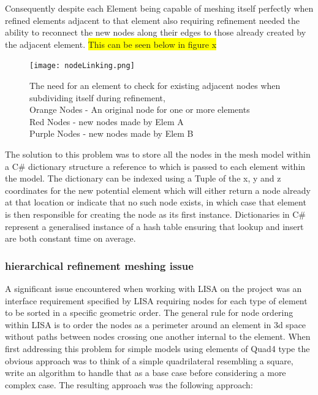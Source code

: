 \documentclass{article}
\begin{document}
\noindent
Consequently despite each Element being capable of meshing itself perfectly when refined elements adjacent to that element also requiring refinement needed the ability to reconnect the new nodes along their edges to those already created by the adjacent element. \colorbox{yellow}{This can be seen below in figure x} \\ 


\begin{figure}
  \centerline{\texttt{[image: nodeLinking.png]}}
  \caption{The need for an element to check for existing adjacent nodes when subdividing itself during refinement,\\
  	Orange Nodes - An original node for one or more elements \\
	Red Nodes - new nodes made by Elem A \\
	Purple Nodes - new nodes made by Elem B \\
  }
  \label{fig:h-refinementImp}
\end{figure}


\noindent
The solution to this problem was to store all the nodes in the mesh model within a C\# dictionary structure a reference to which is passed to each element within the model. The dictionary can be indexed using a Tuple of the x, y and z coordinates for the new potential element which will either return a node already at that location or indicate that no such node exists, in which case that element is then responsible for creating the node as its first instance. Dictionaries in C\# represent a generalised instance of a hash table ensuring that lookup and insert are both constant time on average.


\subsubsection{hierarchical refinement meshing issue}
A significant issue encountered when working with LISA on the project was an interface requirement specified by LISA requiring nodes for each type of element to be sorted in a specific geometric order. The general rule for node ordering within LISA is to order the nodes as a perimeter around an element in 3d space without paths between nodes crossing one another internal to the element. When first addressing this problem for simple models using elements of Quad4 type the obvious approach was to think of a simple quadrilateral resembling a square, write an algorithm to handle that as a base case before considering a more complex case. The resulting approach was the following approach:
\end{document}
